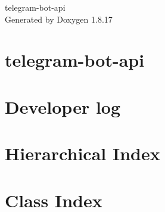 \let\mypdfximage\pdfximage\def\pdfximage{\immediate\mypdfximage}\documentclass[twoside]{book}
\newcommand{\+}{\discretionary{\mbox{\scriptsize$\hookleftarrow$}}{}{}}
\newcommand{\clearemptydoublepage}{%
  \newpage{\pagestyle{empty}\cleardoublepage}%
}
\begin{document}
\hypersetup{pageanchor=false,
             bookmarksnumbered=true,
             pdfencoding=unicode
            }
\begin{titlepage}
\vspace*{7cm}
\begin{center}%
{\Large telegram-\/bot-\/api }\\
\vspace*{1cm}
{\large Generated by Doxygen 1.8.17}\\
\end{center}
\end{titlepage}
\clearemptydoublepage
{}
\tableofcontents
\clearemptydoublepage
{}
\hypersetup{pageanchor=true}

\chapter{telegram-\/bot-\/api}
\label{index}\hypertarget{index}{}
\chapter{Developer log}
\label{main}

\chapter{Hierarchical Index}

\chapter{Class Index}

\end{document}
